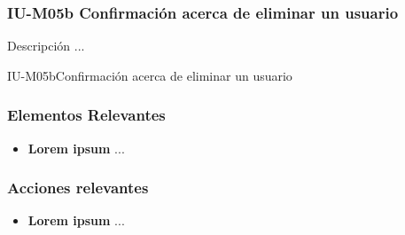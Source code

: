 
\subsubsection{IU-M05b Confirmación acerca de eliminar un usuario}

 Descripción ...

        {IU-M05b}{Confirmación acerca de eliminar un usuario}

\subsubsection{Elementos Relevantes}

    \begin{itemize}
    \item {\bf Lorem ipsum}
        ...
    \end{itemize}

\subsubsection{Acciones relevantes}

    \begin{itemize}
    \item {\bf Lorem ipsum}
        ...
    \end{itemize}

\clearpage
